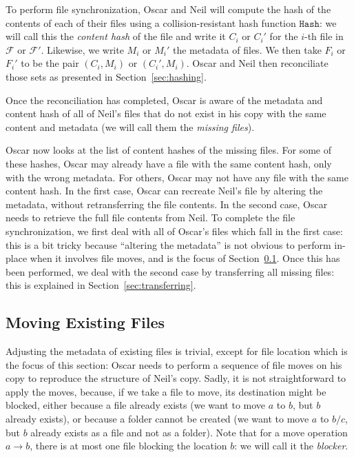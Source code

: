 \documentclass[11pt]{llncs}
\newcommand{\Files}{\mathcal{F}}
\newcommand{\Hash}{\ensuremath{\mathtt{Hash}}}
\begin{document}
To perform file synchronization, Oscar and Neil will compute the hash of the
contents of each of their files using a collision-resistant hash function
$\Hash$: we will call this the \emph{content hash} of the file and write it
$C_i$ or $C_i'$ for the $i$-th file in $\Files$ or $\Files'$. Likewise, we
write $M_i$ or $M_i'$ the metadata of files. We then take $F_i$ or $F_i'$ to be
the pair $(C_i, M_i)$ or $(C_i', M_i)$. Oscar and Neil then reconciliate those
sets as presented in Section~\ref{sec:hashing}.

Once the reconciliation has completed, Oscar is aware of the metadata and
content hash of all of Neil's files that do not exist in his copy with the same
content and metadata (we will call them the \emph{missing files}).

Oscar now looks at the list of content hashes of the missing files. For some of
these hashes, Oscar may already have a file with the same content hash, only
with the wrong metadata. For others, Oscar may not have any file with the same
content hash. In the first case, Oscar can recreate Neil's file by altering the
metadata, without retransferring the file contents. In the second case, Oscar
needs to retrieve the full file contents from Neil. To complete the file
synchronization, we first deal with all of Oscar's files which fall in the first
case: this is a bit tricky because ``altering the metadata'' is not obvious to
perform in-place when it involves file moves, and is the focus of
Section~\ref{sec:moving}. Once this has been performed, we deal with the second case by transferring all missing
files: this is explained in Section~\ref{sec:transferring}.

\subsection{Moving Existing Files}
\label{sec:moving}

Adjusting the metadata of existing files is trivial, except for file location which is the focus of this section: Oscar needs to perform a sequence of file moves on his copy to reproduce the structure of Neil's copy. Sadly, it is not straightforward to apply the moves, because, if we take a file to move, its destination might be blocked, either because a file already exists (we want to move $a$ to $b$, but $b$ already exists), or because a folder cannot be created (we want to move $a$ to $b/c$, but $b$ already exists as a file and not as a folder). Note that for a move operation $a \rightarrow b$, there is at most one file blocking the location $b$: we will call it the \textit{blocker}.
\end{document}
